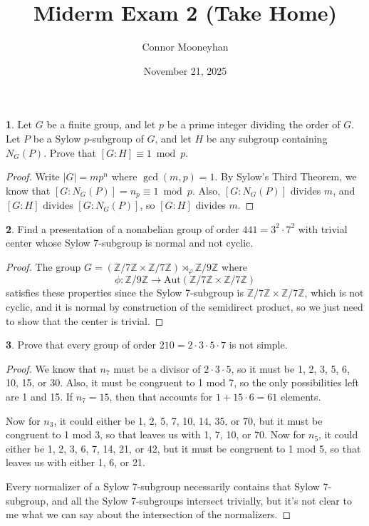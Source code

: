 \documentclass[12pt]{article}
\title{Miderm Exam 2 (Take Home)}
\author{Connor Mooneyhan}
\date{November 21, 2025}
\theoremstyle{definition}
\newtheorem{ex}{}
\newenvironment{exercise}[1]{
	\renewcommand{\theex}{#1}
	\begin{ex}
		}{\end{ex}}
\begin{document}
\maketitle

\begin{exercise}{2}
	Let $G$ be a finite group, and let $p$ be a prime integer dividing the order of $G$.
	Let $P$ be a Sylow $p$-subgroup of $G$, and let $H$ be any subgroup containing $N_G(P)$.
	Prove that $[G : H] \equiv 1 \bmod p$.
\end{exercise}
\begin{proof}
	Write $|G| = mp^n$ where $\gcd(m, p) = 1$.
	By Sylow's Third Theorem, we know that $[G : N_G(P)] = n_p \equiv 1 \bmod p$.
	Also, $[G : N_G(P)]$ divides $m$, and $[G : H]$ divides $[G : N_G(P)]$, so $[G : H]$ divides $m$.
\end{proof}

\begin{exercise}{5}
	Find a presentation of a nonabelian group of order $441 = 3^2 \cdot 7^2$ with trivial center whose Sylow 7-subgroup is normal and not cyclic.
\end{exercise}
\begin{proof}
	The group $G = (\mathbb{Z}/7 \mathbb{Z} \times \mathbb{Z}/7 \mathbb{Z}) \rtimes_\varphi \mathbb{Z}/9 \mathbb{Z}$ where \begin{equation*}
    \phi: \mathbb{Z}/9 \mathbb{Z} \to \mathrm{Aut}(\mathbb{Z}/7 \mathbb{Z} \times \mathbb{Z}/7 \mathbb{Z})
  \end{equation*} satisfies these properties since the Sylow 7-subgroup is $\mathbb{Z}/ 7 \mathbb{Z} \times \mathbb{Z}/7 \mathbb{Z}$, which is not cyclic, and it is normal by construction of the semidirect product, so we just need to show that the center is trivial.
\end{proof}

\begin{exercise}{6}
	Prove that every group of order $210 = 2 \cdot 3 \cdot 5 \cdot 7$ is not simple.
\end{exercise}
\begin{proof}
	We know that $n_7$ must be a divisor of $2 \cdot 3 \cdot 5$, so it must be 1, 2, 3, 5, 6, 10, 15, or 30.
	Also, it must be congruent to 1 mod 7, so the only possibilities left are 1 and 15.
	If $n_7 = 15$, then that accounts for $1 + 15 \cdot 6 = 61$ elements.

	Now for $n_3$, it could either be 1, 2, 5, 7, 10, 14, 35, or 70, but it must be congruent to 1 mod 3, so that leaves us with 1, 7, 10, or 70.
	Now for $n_5$, it could either be 1, 2, 3, 6, 7, 14, 21, or 42, but it must be congruent to 1 mod 5, so that leaves us with either 1, 6, or 21.

  Every normalizer of a Sylow 7-subgroup necessarily contains that Sylow 7-subgroup, and all the Sylow 7-subgroups intersect trivially, but it's not clear to me what we can say about the intersection of the normalizers.
\end{proof}
\end{document}
